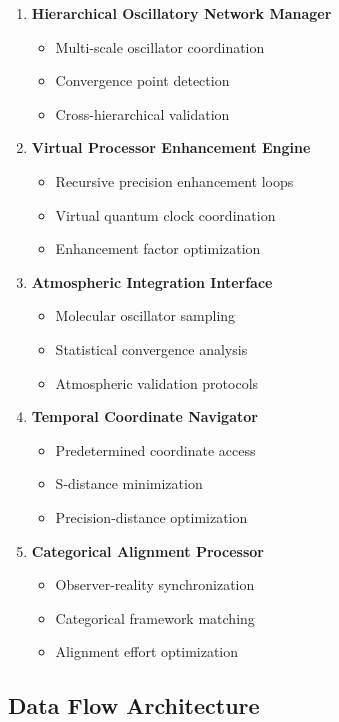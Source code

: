 \documentclass[12pt,a4paper]{article}
\begin{document}
\begin{enumerate}
\item \textbf{Hierarchical Oscillatory Network Manager}
   \begin{itemize}
   \item Multi-scale oscillator coordination
   \item Convergence point detection
   \item Cross-hierarchical validation
   \end{itemize}

\item \textbf{Virtual Processor Enhancement Engine}
   \begin{itemize}
   \item Recursive precision enhancement loops
   \item Virtual quantum clock coordination
   \item Enhancement factor optimization
   \end{itemize}

\item \textbf{Atmospheric Integration Interface}
   \begin{itemize}
   \item Molecular oscillator sampling
   \item Statistical convergence analysis
   \item Atmospheric validation protocols
   \end{itemize}

\item \textbf{Temporal Coordinate Navigator}
   \begin{itemize}
   \item Predetermined coordinate access
   \item S-distance minimization
   \item Precision-distance optimization
   \end{itemize}

\item \textbf{Categorical Alignment Processor}
   \begin{itemize}
   \item Observer-reality synchronization
   \item Categorical framework matching
   \item Alignment effort optimization
   \end{itemize}
\end{enumerate}

\subsection{Data Flow Architecture}
\end{document}
